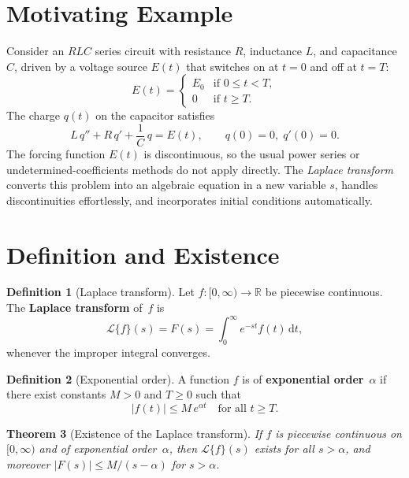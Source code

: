 \documentclass[12pt,a4paper,openany]{book}
\theoremstyle{definition}
\newtheorem{definition}{Definition}[chapter]
\theoremstyle{plain}
\newtheorem{theorem}[definition]{Theorem}
\theoremstyle{remark}
\newcommand{\R}{\mathbb{R}}
\newcommand{\dd}{\mathrm{d}}
\newcommand{\abs}[1]{\left|#1\right|}
\begin{document}
\section{Motivating Example}
\label{sec:laplace-motivation}

Consider an \(RLC\) series circuit with resistance \(R\), inductance \(L\),
and capacitance \(C\), driven by a voltage source \(E(t)\) that switches on at \(t=0\)
and off at \(t=T\):
\[
  E(t) = \begin{cases} E_0 & \text{if } 0 \le t < T, \\ 0 & \text{if } t \ge T. \end{cases}
\]
The charge \(q(t)\) on the capacitor satisfies
\begin{equation}\label{eq:rlc-ode}
  L\,q'' + R\,q' + \frac{1}{C}\,q = E(t), \qquad q(0)=0,\; q'(0)=0.
\end{equation}
The forcing function \(E(t)\) is discontinuous, so the usual power series or
undetermined-coefficients methods do not apply directly. The \emph{Laplace
transform} converts this problem into an
algebraic equation in a new variable \(s\), handles discontinuities
effortlessly, and incorporates initial conditions automatically.

\section{Definition and Existence}
\label{sec:laplace-def}

\begin{definition}[Laplace transform]
\label{def:laplace}
Let \(f\colon [0,\infty)\to\R\) be piecewise continuous. The
\textbf{Laplace transform} of~\(f\) is
\begin{equation}\label{eq:laplace-def}
  \mathcal{L}\{f\}(s) = F(s) = \int_0^\infty e^{-st} f(t)\,\dd t,
\end{equation}
whenever the improper integral converges.
\end{definition}

\begin{definition}[Exponential order]
\label{def:exp-order}
A function \(f\) is of \textbf{exponential order}~\(\alpha\) if there exist
constants \(M>0\) and \(T\ge 0\) such that
\[
  \abs{f(t)} \le M\,e^{\alpha t} \quad \text{for all } t \ge T.
\]
\end{definition}

\begin{theorem}[Existence of the Laplace transform]
\label{thm:laplace-existence}
If \(f\) is piecewise continuous on \([0,\infty)\) and of exponential
order~\(\alpha\), then \(\mathcal{L}\{f\}(s)\) exists for all \(s>\alpha\),
and moreover \(\abs{F(s)} \le M/(s-\alpha)\) for \(s>\alpha\).
\end{theorem}
\end{document}
